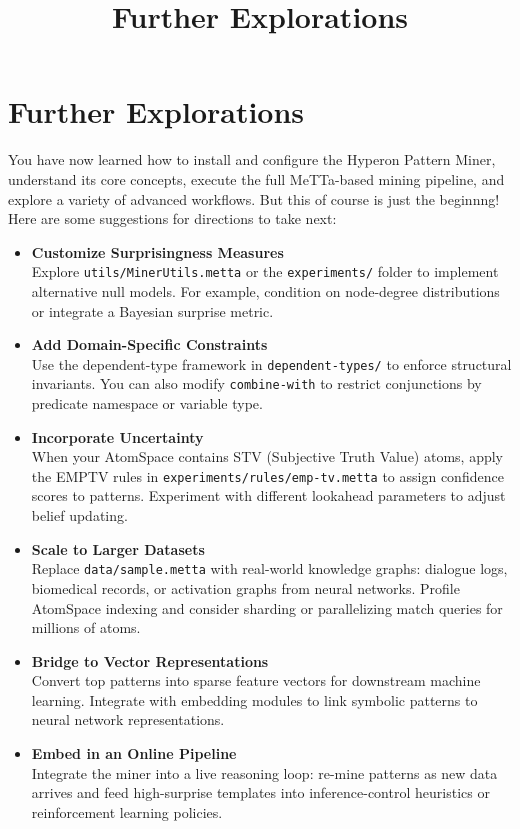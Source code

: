 \documentclass{article}
\title{Further Explorations}
\begin{document}
\section{Further Explorations}

You have now learned how to install and configure the Hyperon Pattern Miner, understand its core concepts, execute the full MeTTa-based mining pipeline, and explore a variety of advanced workflows.  But this of course is just the beginnng! Here are some suggestions for directions to take next:

\begin{itemize}
  \item \textbf{Customize Surprisingness Measures}\\
    Explore \texttt{utils/MinerUtils.metta} or the \texttt{experiments/} folder to implement alternative null models.  For example, condition on node-degree distributions or integrate a Bayesian surprise metric.
  \item \textbf{Add Domain-Specific Constraints}\\
    Use the dependent-type framework in \texttt{dependent-types/} to enforce structural invariants.  You can also modify \texttt{combine-with} to restrict conjunctions by predicate namespace or variable type.
  \item \textbf{Incorporate Uncertainty}\\
    When your AtomSpace contains STV (Subjective Truth Value) atoms, apply the EMPTV rules in \texttt{experiments/rules/emp-tv.metta} to assign confidence scores to patterns.  Experiment with different lookahead parameters to adjust belief updating.
  \item \textbf{Scale to Larger Datasets}\\
    Replace \texttt{data/sample.metta} with real-world knowledge graphs: dialogue logs, biomedical records, or activation graphs from neural networks.  Profile AtomSpace indexing and consider sharding or parallelizing match queries for millions of atoms.
  \item \textbf{Bridge to Vector Representations}\\
    Convert top patterns into sparse feature vectors for downstream machine learning.  Integrate with embedding modules to link symbolic patterns to neural network representations.
  \item \textbf{Embed in an Online Pipeline}\\
    Integrate the miner into a live reasoning loop: re-mine patterns as new data arrives and feed high-surprise templates into inference-control heuristics or reinforcement learning policies.

\end{itemize}
\end{document}
